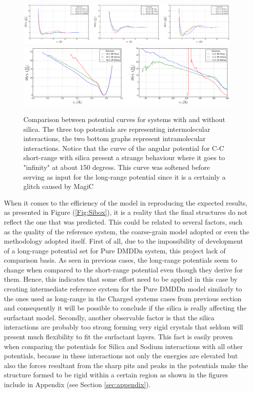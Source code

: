 \documentclass[10pt,a4paper,twoside]{article}
\begin{document}
\begin{figure}[H]
  \begin{center}
	\includegraphics[width=1 \textwidth]{./graphs/Sipotsinter}
	\includegraphics[width=.66 \textwidth]{./graphs/Sipotsintra}
	\caption{Comparison between potential curves for systems with and without silica. The three top potentials are representing intermolecular interactions, the two bottom graphs represent intramolecular interactions. Notice that the curve of the angular potential for C-C short-range with silica present a strange behaviour where it goes to "infinity" at about 150 degress. This curve was softened before serving as input for the long-range potential since it is a certainly a glitch caused by MagiC}
	\label{Fig:SiPots}
  \end{center}
\end{figure} 

   When it comes to the efficiency of the  model in reproducing the expected results, as presented in Figure (\ref{Fig:Sibox}), it is a reality that the final structures do not reflect the one that was predicted. This could be related to several factors, such as the quality of the reference system, the coarse-grain model adopted or even the methodology adopted itself. First of all, due to the impossibility of development  of a long-range potential set for Pure DMDDn system, this project lack of comparison basis. As seen in previous cases, the long-range potentials seem to change when compared to the short-range potential even though they derive for them. Hence, this indicates that some effort need to be applied in this case by creating intermediate reference system for the Pure DMDDn model similarly to the ones used as long-range in the Charged systems cases from previous section and consequently it will be possible to conclude if the silica is really affecting the surfactant model. Secondly, another observable factor is that the silica interactions are probably too strong forming very rigid crystals that  seldom will present much flexibility to fit the surfactant layers. This fact is easily proven when comparing the potentials for Silica and Sodium interactions with all other potentials, because in these interactions not only the energies are elevated but also the forces resultant from the sharp pits and peaks in the potentials make the structure formed to be rigid within a certain region as shown in the figures include in Appendix (see Section \ref{sec:appendix}).
   
\end{document}
